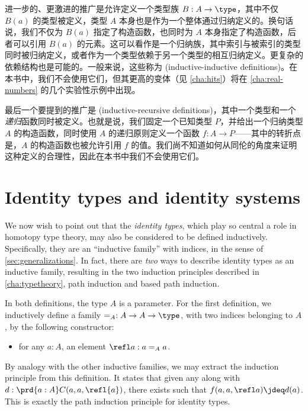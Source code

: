 %
%
进一步的、更激进的推广是允许定义一个类型族 $B:A\to \type$，其中不仅 $B(a)$ 的类型被定义，类型 $A$ 本身也是作为一个整体通过归纳定义的。换句话说，我们不仅为 $B(a)$ 指定了构造函数，也同时为 $A$ 本身指定了构造函数，后者可以引用 $B(a)$ 的元素。这可以看作是一个归纳族，其中索引与被索引的类型同时被归纳定义，或者作为一个类型依赖于另一个类型的相互归纳定义。更复杂的依赖结构也是可能的。一般来说，这些称为 (inductive-inductive definitions)。在本书中，我们不会使用它们，但其更高的变体（见 \cref{cha:hits}）将在 \cref{cha:real-numbers} 的几个实验性示例中出现。

%
%
最后一个要提到的推广是 (inductive-recursive definitions)，其中一个类型和一个\emph{递归}函数同时被定义。也就是说，我们固定一个已知类型 $P$，并给出一个归纳类型 $A$ 的构造函数，同时使用 $A$ 的递归原则定义一个函数 $f:A\to P$——其中的转折点是，$A$ 的构造函数也被允许引用 $f$ 的值。我们尚不知道如何从同伦的角度来证明这种定义的合理性，因此在本书中我们不会使用它们。

%

\section{Identity types and identity systems}
\label{sec:identity-systems}

%
We now wish to point out that the \emph{identity types}, which play so central a role in homotopy type theory, may also be considered to be defined inductively.
Specifically, they are an ``inductive family'' with indices, in the sense of \cref{sec:generalizations}.
In fact, there are \emph{two} ways to describe identity types as an
inductive family, resulting in the two induction principles described in
\cref{cha:typetheory}, path induction and based path induction.

In both definitions, the type $A$ is a parameter.
For the first definition, we inductively define a family $=_A : A\to A\to \type$, with two indices belonging to $A$, by the following constructor:
\begin{itemize}
\item for any $a:A$, an element $\refl a : a=_A a$.
\end{itemize}
By analogy with the other inductive families, we may extract the induction principle from this definition.
It states that given any  along with $d:\prd{a:A} C(a,a,\refl{a})$, there exists  such that $f(a,a,\refl a)\jdeq d(a)$.
This is exactly the path induction principle for identity types.

